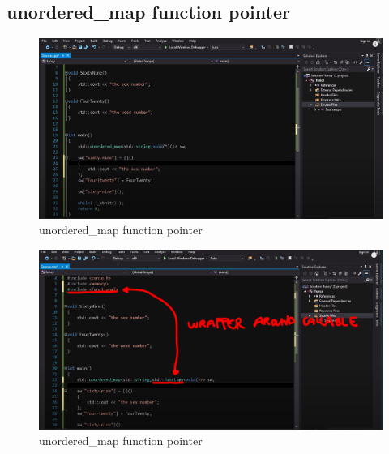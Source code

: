 \subsection{unordered\_map function pointer}

\begin{figure}[H]
	\centering
	\includegraphics[width=1.2\textwidth, height=1.2\textheight, keepaspectratio]{./imgs/function_pointers_unordered_map_pointer_to_a_function_lambda_function.png}
	\caption{unordered\_map function pointer}
	\label{fig:function_pointers_unordered_map_pointer_to_a_function_lambda_function}
\end{figure}

\begin{figure}[H]
	\centering
	\includegraphics[width=1.2\textwidth, height=1.2\textheight, keepaspectratio]{./imgs/function_pointers_unordered_map_functional_std_function.png}
	\caption{unordered\_map function pointer}
	\label{fig:function_pointers_unordered_map_functional_std_function}
\end{figure}



